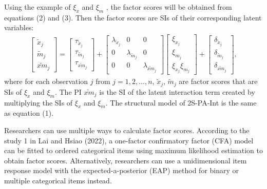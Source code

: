 \documentclass[
  man]{apa6}
\begin{document}
Using the example of \(\xi_{x}\) and \(\xi_{m}\) , the factor scores will be obtained from equations (2) and (3). Then the factor scores are SIs of their corresponding latent variables:
\begin{align}
    \begin{bmatrix}
        \tilde{x}_{j} \\ 
        \tilde{m}_{j} \\
        \widetilde{xm}_{j} 
    \end{bmatrix} = 
    \begin{bmatrix}
        \tau_{\tilde{x}_{j}} \\
        \tau_{\tilde{m}_{j}} \\ 
        \tau_{\widetilde{xm}_{j}}
    \end{bmatrix} + 
    \begin{bmatrix}
        \lambda_{\tilde{x}_{j}} & 0 & 0 \\
        0 & \lambda_{\tilde{m}_{j}} & 0 \\ 
        0 & 0 & \lambda_{\widetilde{xm}_{j}} 
    \end{bmatrix} 
    \begin{bmatrix}
        \xi_{x_{j}} \\  
        \xi_{m_{j}} \\
        \xi_{x_{j}}\xi_{m_{j}}
    \end{bmatrix} +
    \begin{bmatrix}
        \delta_{\tilde{x}_{j}} \\
        \delta_{\tilde{m}_{j}} \\ 
        \delta_{\widetilde{xm}_{j}}
    \end{bmatrix},
\end{align}
where for each observation \(j\) from \(j = 1, 2, ..., n\), \(\tilde{x}_{j}\), \(\tilde{m}_{j}\) are factor scores that are SIs of \(\xi_{x}\) and \(\xi_{m}\). The PI \(\widetilde{xm}_{j}\) is the SI of the latent interaction term created by multiplying the SIs of \(\xi_{x}\) and \(\xi_{m}\). The structural model of 2S-PA-Int is the same as equation (1).

Researchers can use multiple ways to calculate factor scores. According to the study 1 in Lai and Hsiao (2022), a one-factor confirmatory factor (CFA) model can be fitted to ordered categorical items using maximum likelihood estimation to obtain factor scores. Alternatively, researchers can use a unidimensional item response model with the expected-a-posterior (EAP) method for binary or multiple categorical items instead.
\end{document}
